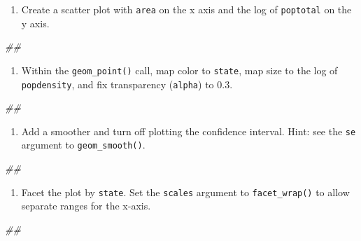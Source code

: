 \documentclass[
]{book}
\newenvironment{Shaded}{\begin{snugshade}}{\end{snugshade}}
\newcommand{\CommentTok}[1]{\textcolor[rgb]{0.56,0.35,0.01}{\textit{#1}}}
\providecommand{\tightlist}{%
  \setlength{\itemsep}{0pt}\setlength{\parskip}{0pt}}
\begin{document}
\begin{enumerate}
\def\labelenumi{\arabic{enumi}.}
\tightlist
\item
  Create a scatter plot with \texttt{area} on the x axis and the log of \texttt{poptotal} on the y axis.
\end{enumerate}

\begin{Shaded}
\begin{Highlighting}[]
\CommentTok{## }
\end{Highlighting}
\end{Shaded}

\begin{enumerate}
\def\labelenumi{\arabic{enumi}.}
\setcounter{enumi}{1}
\tightlist
\item
  Within the \texttt{geom\_point()} call, map color to \texttt{state}, map size to the log of \texttt{popdensity}, and fix transparency (\texttt{alpha}) to 0.3.
\end{enumerate}

\begin{Shaded}
\begin{Highlighting}[]
\CommentTok{## }
\end{Highlighting}
\end{Shaded}

\begin{enumerate}
\def\labelenumi{\arabic{enumi}.}
\setcounter{enumi}{2}
\tightlist
\item
  Add a smoother and turn off plotting the confidence interval. Hint: see the \texttt{se} argument to \texttt{geom\_smooth()}.
\end{enumerate}

\begin{Shaded}
\begin{Highlighting}[]
\CommentTok{## }
\end{Highlighting}
\end{Shaded}

\begin{enumerate}
\def\labelenumi{\arabic{enumi}.}
\setcounter{enumi}{3}
\tightlist
\item
  Facet the plot by \texttt{state}. Set the \texttt{scales} argument to \texttt{facet\_wrap()} to allow separate ranges for the x-axis.
\end{enumerate}

\begin{Shaded}
\begin{Highlighting}[]
\CommentTok{## }
\end{Highlighting}
\end{Shaded}
\end{document}
